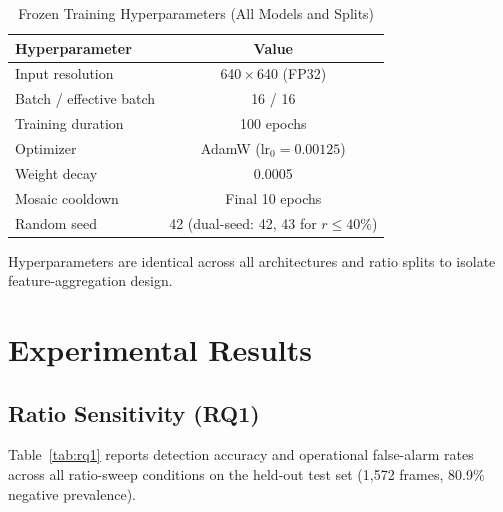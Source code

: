 \documentclass[conference]{IEEEtran}
\begin{document}
\begin{table}[t]
\caption{Frozen Training Hyperparameters (All Models and Splits)}
\label{tab:training}
\centering
\setlength{\tabcolsep}{5pt}
\begin{tabular}{lc}
\toprule
\textbf{Hyperparameter} & \textbf{Value} \\
\midrule
Input resolution          & 640\,$\times$\,640 (FP32) \\
Batch / effective batch   & 16 / 16 \\
Training duration         & 100 epochs \\
Optimizer                 & AdamW ($\mathrm{lr}_0{=}0.00125$) \\
Weight decay              & 0.0005 \\
Mosaic cooldown           & Final 10 epochs \\
Random seed               & 42 (dual-seed: 42, 43 for $r \le 40\%$) \\
\bottomrule
\end{tabular}
\vspace{1pt}
{\footnotesize Hyperparameters are identical across all architectures
and ratio splits to isolate feature-aggregation design.}
\end{table}

\section{Experimental Results}
\label{sec:results}

\subsection{Ratio Sensitivity (RQ1)}
\label{subsec:rq1_results}

Table~\ref{tab:rq1} reports detection accuracy and operational
false-alarm rates across all ratio-sweep conditions on the held-out
test set (1,572 frames, 80.9\% negative prevalence).
\end{document}
